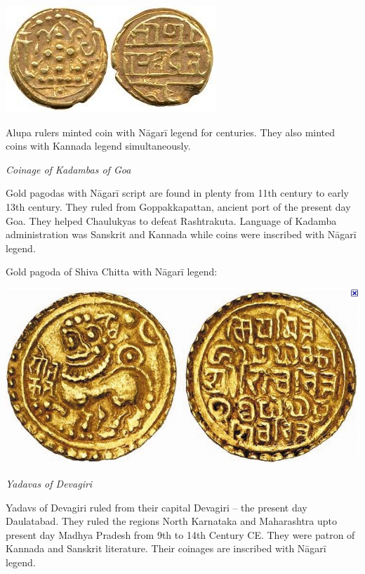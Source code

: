 \vskip 3pt

\centerline{\includegraphics[scale=0.53]{"images/article-06/art06-fig15.jpg"}}

Alupa rulers minted coin with Nāgarī legend for centuries. They also minted coins with Kannada legend simultaneously.

\textit{Coinage of Kadambas of Goa}

Gold pagodas with Nāgarī script are found in plenty from 11th century to early 13th century. They ruled from Goppakkapattan, ancient port of the present day Goa. They helped Chaulukyas to defeat Rashtrakuta. Language of Kadamba administration was Sanskrit and Kannada while coins were inscribed with Nāgarī legend.

Gold pagoda of Shiva Chitta with Nāgarī legend:

\vskip 3pt

\centerline{\includegraphics[scale=0.6]{"images/article-06/art06-fig16.jpg"}}

\textit{Yadavas of Devagiri}

Yadavs of Devagiri ruled from their capital Devagiri – the present day Daulatabad. They ruled the regions North Karnataka and Maharashtra upto present day Madhya Pradesh from 9th to 14th Century CE. They were patron of Kannada and Sanskrit literature. Their coinages are inscribed with Nāgarī legend.

